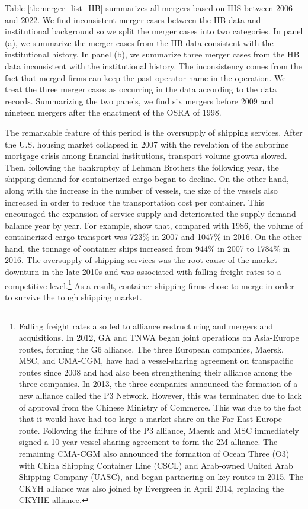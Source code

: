 \documentclass[10pt]{article}
\begin{document}
Table \ref{tb:merger_list_HB} summarizes all mergers based on IHS between 2006 and 2022. 
We find inconsistent merger cases between the HB data and institutional background so we split the merger cases into two categories.
In panel (a), we summarize the merger cases from the HB data consistent with the institutional history.
In panel (b), we summarize three merger cases from the HB data inconsistent with the institutional history.
The inconsistency comes from the fact that merged firms can keep the past operator name in the operation. 
We treat the three merger cases as occurring in the data according to the data records.
Summarizing the two panels, we find six mergers before 2009 and nineteen mergers after the enactment of the OSRA of 1998.

The remarkable feature of this period is the oversupply of shipping services.
After the U.S. housing market collapsed in 2007 with the revelation of the subprime mortgage crisis among financial institutions, transport volume growth slowed. 
Then, following the bankruptcy of Lehman Brothers the following year, the shipping demand for containerized cargo began to decline. 
On the other hand, along with the increase in the number of vessels, the size of the vessels also increased in order to reduce the transportation cost per container. 
This encouraged the expansion of service supply and deteriorated the supply-demand balance year by year. 
For example, \cite{matsuda2022} show that, compared with 1986, the volume of containerized cargo transport was 723\% in 2007 and 1047\% in 2016. On the other hand, the tonnage of container ships increased from 944\% in 2007 to 1784\% in 2016.
The oversupply of shipping services was the root cause of the market downturn in the late 2010s and was associated with falling freight rates to a competitive level.\footnote{Falling freight rates also led to alliance restructuring and mergers and acquisitions. In 2012, GA and TNWA began joint operations on Asia-Europe routes, forming the G6 alliance. The three European companies, Maersk, MSC, and CMA-CGM, have had a vessel-sharing agreement on transpacific routes since 2008 and had also been strengthening their alliance among the three companies. In 2013, the three companies announced the formation of a new alliance called the P3 Network. However, this was terminated due to lack of approval from the Chinese Ministry of Commerce. This was due to the fact that it would have had too large a market share on the Far East-Europe route. Following the failure of the P3 alliance, Maersk and MSC immediately signed a 10-year vessel-sharing agreement to form the 2M alliance. The remaining CMA-CGM also announced the formation of Ocean Three (O3) with China Shipping Container Line (CSCL) and Arab-owned United Arab Shipping Company (UASC), and began partnering on key routes in 2015. The CKYH alliance was also joined by Evergreen in April 2014, replacing the CKYHE alliance.} As a result, container shipping firms chose to merge in order to survive the tough shipping market.
\end{document}
